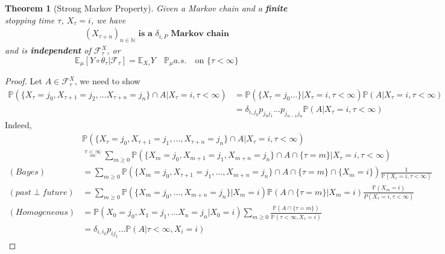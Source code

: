 \documentclass[a4paper,11pt]{book}
\newtheorem{theorem}{Theorem}[section]
\theoremstyle{definition}
\theoremstyle{remark}
\begin{document}
 
\begin{theorem}[Strong Markov Property]
	Given a Markov chain and a \textbf{finite} stopping time $\tau$, $X_\tau = i$, we have
	\begin{align*}
		(X_{\tau + n})_{n \in \mathbb{N}} \textbf{ is a $\delta_{i, P}$ Markov chain}
	\end{align*}
	and is \textbf{independent} of $\mathcal{F}^X_\tau$, or
 	\begin{equation*}
 		\mathbb{E}_\mu [Y \circ \theta_\tau|\mathcal{F}_\tau] = \mathbb{E}_{X_\tau} Y \quad \mathbb{P}_\mu a.s. \quad \text{on } \{\tau < \infty\}
 	\end{equation*}
\end{theorem}
\begin{proof}
	Let $A \in \mathcal{F}^X_\tau$, we need to show 
	\begin{align*}
		\mathbb{P}(\{X_\tau = j_0, X_{\tau + 1} = j_2, \dots  X_{\tau + n} = j_n\} \cap A| X_\tau = i, \tau < \infty )
		&= \mathbb{P}(\{ X_\tau = j_0 \dots \}|X_\tau = i, \tau < \infty)\mathbb{P}(A|X_\tau = i, \tau < \infty)\\
		&= \delta_{i, j_0}p_{j_0j_1} \dots p_{j_{n-1}j_n} \mathbb{P}(A |X_\tau = i, \tau < \infty)
	\end{align*}
	Indeed, 
	\begin{align*}
		&\mathbb{P}(\{X_\tau = j_0, X_{\tau + 1} = j_1,\dots, X_{\tau + n} = j_n\} \cap A| X_\tau = i, \tau < \infty )	\\
		&\overset{\tau < \infty} = \sum_{m \ge 0} \mathbb{P}(\{X_m = j_0, X_{m + 1} = j_1, X_{m + n} = j_n\} \cap A \cap  \{\tau = m\}| X_\tau = i, \tau < \infty )\\
		(Bayes) &= \sum_{m \geq 0}\mathbb{P}(\{ X_m = j_0, X_{\tau + 1} = j_1, \dots, X_{m + n} = j_n\} \cap A \cap\{\tau = m\} \cap  \{X_m = i\} ) \frac{1}{\mathbb{P}(X_\tau = i, \tau < \infty)} \\
		(past\perp future) 
		&= \sum_{m \geq 0} \mathbb{P}(\{X_m = j_0,\dots, X_{m + n} = j_n\}| X_m = i) \mathbb{P}(A \cap \{\tau = m\}|X_m = i) \frac{\mathbb{P}(X_m = i)}{P(X_\tau = i, \tau < \infty)} \\
		(Homogeneous)&= \mathbb{P}(X_0 = j_0, X_1 = j_1, \dots X_n = j_n|X_0 = i) \sum_{ m \geq 0}\frac{\mathbb{P}(A \cap \{\tau = m\})}{\mathbb{P}(\tau < \infty, X_\tau = i)}\\
		&= \delta_{i, i_0} p_{i j_1} \dots \mathbb{P}(A | \tau < \infty, X_i = i)
	\end{align*}
\end{proof}
\end{document}
